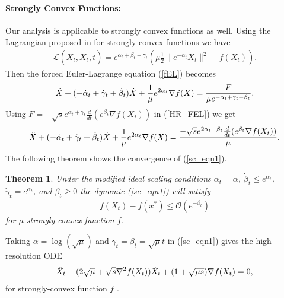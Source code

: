 \documentclass{article}
\theoremstyle{plain}
\newtheorem{thm}{\textbf{Theorem}}
\theoremstyle{definition}
\theoremstyle{remark}
\begin{document}
\paragraph{Strongly Convex Functions:} Our analysis is applicable to strongly convex functions as well. Using the Lagrangian proposed in \cite{wilson2021lyapunov} for strongly convex functions we have
\begin{align}\label{strongly_cvx_lagrange}
    \mathcal{L}(X_t,\dot X_t,t)=e^{\alpha_t+\beta_t+\gamma_t}(\mu \frac{1}{2}\|e^{-\alpha_t}\dot X_t\|^2-f(X_t)).
\end{align}
Then the forced Euler-Lagrange equation (\ref{fEL}) becomes
\begin{align}\label{HR_FEL}
    \Ddot{X}+(-\dot \alpha_t + \dot 
 \gamma_t+ \dot \beta_t)\dot X+\frac{1}{\mu}e^{2\alpha_t}\nabla f(X)=\frac{F}{\mu e^{-\alpha_t + \gamma_t + \beta_t}}.
\end{align}
Using $F=-\sqrt{s}e^{\alpha_t+\gamma_t}\frac{d}{dt}(e^{\beta_t}\nabla f(X_t))$ in (\ref{HR_FEL})
we get
\begin{align}\label{sc_eqn1}
    \Ddot{X}+(-\dot \alpha_t + \dot 
 \gamma_t+ \dot \beta_t)\dot X+\frac{1}{\mu}e^{2\alpha_t}\nabla f(X)=\frac{-\sqrt{s}e^{2\alpha_t-\beta_t}\frac{d}{dt}(e^{\beta_t}\nabla f(X_t))}{\mu }.
\end{align}
The following theorem shows the convergence of (\ref{sc_eqn1}).
\begin{thm}\label{Theorem3_1}
    Under the modified ideal scaling conditions $\alpha_t=\alpha$, $\dot \beta_t\leq e^{\alpha_t}$, $\dot \gamma_t=e^{\alpha_t}$, and $\dot \beta_t\geq 0$ the dynamic (\ref{sc_eqn1}) will satisfy
    \begin{align}\label{Theorem32_eqn1}
      f(X_t)-f(x^*)\leq \mathcal{O}(e^{-\beta_t})  
    \end{align}
    for $\mu$-strongly convex function $f$.
\end{thm}

Taking $\alpha=\log(\sqrt{\mu})$ and $\gamma_t=\beta_t=\sqrt{\mu}t$ in (\ref{sc_eqn1}) gives the high-resolution ODE 
\begin{align}\label{high-res-ODE}
    \Ddot{X}_t+(2\sqrt{\mu}+\sqrt{s}\nabla^2 f(X_t))\dot X_t +(1+\sqrt{\mu s })\nabla f(X_t)=0,
\end{align}
for strongly-convex function $f$ \cite{Shi2021UnderstandingTA}.
\end{document}
